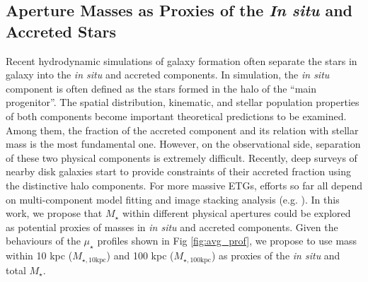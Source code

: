 \documentclass[a4paper,fleqn,usenatbib]{mnras}
\def\mstar{{$M_{\star}$}}
\def\minn{{$M_{\star,10\mathrm{kpc}}$}}
\def\mtot{{$M_{\star,100\mathrm{kpc}}$}}
\def\mden{{$\mu_{\star}$}}
\begin{document}
    

\subsection{Aperture Masses as Proxies of the \textit{In situ} and Accreted Stars}
    \label{ssec:insitu}
    
    Recent hydrodynamic simulations of galaxy formation often separate the stars in 
    galaxy into the \textit{in situ} and accreted components. 
    In simulation, the \textit{in situ} component is often defined as the stars formed 
    in the halo of the ``main progenitor''.  
    The spatial distribution, kinematic, and stellar population properties of both 
    components become important theoretical predictions to be examined. 
    Among them, the fraction of the accreted component and its relation with stellar 
    mass is the most fundamental one. 
    However, on the observational side, separation of these two physical components 
    is extremely difficult. 
    Recently, deep surveys of nearby disk galaxies start to provide constraints of 
    their accreted fraction using the distinctive halo components. 
    For more massive ETGs, efforts so far all depend on multi-component model fitting
    and image stacking analysis (e.g. \citealt{Huang2013a, dSouza2014, Spavone2017}).
    In this work, we propose that \mstar{} within different physical apertures could 
    be explored as potential proxies of masses in \textit{in situ} and accreted 
    components.  
    Given the behaviours of the \mden{} profiles shown in Fig \ref{fig:avg_prof}, 
    we propose to use mass within 10 kpc (\minn{}) and 100 kpc (\mtot{}) as proxies 
    of the \textit{in situ} and total \mstar{}. 
    
\end{document}

